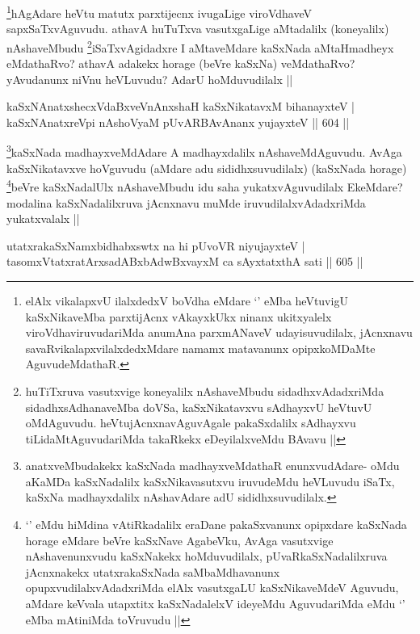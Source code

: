 \begin{artha}
\footnote{elAlx vikalapxvU ilalxdedxV boVdha eMdare `\stext' eMba heVtuvigU kaSxNikaveMba parxtijAcnx vAkayxkUkx ninanx ukitxyalelx viroVdhaviruvudariMda anumAna parxmANaveV udayisuvudilalx, jAcnxnavu savaRvikalapxvilalxdedxMdare namamx matavanunx opipxkoMDaMte AguvudeMdathaR.}hAgAdare heVtu matutx parxtijecnx ivugaLige viroVdhaveV sapxSaTxvAguvudu. athavA huTuTxva vasutxgaLige aMtadalilx (koneyalilx) nAshaveMbudu \footnote{huTiTxruva vasutxvige koneyalilx nAshaveMbudu sidadhxvAdadxriMda sidadhxsAdhanaveMba doVSa, kaSxNikatavxvu sAdhayxvU heVtuvU oMdAguvudu. heVtujAcnxnavAguvAgale pakaSxdalilx sAdhayxvu tiLidaMtAguvudariMda takaRkekx eDeyilalxveMdu BAvavu ||}iSaTxvAgidadxre I aMtaveMdare kaSxNada aMtaHmadheyx eMdathaRvo? athavA adakekx horage (beVre kaSxNa) veMdathaRvo? yAvudanunx niVnu heVLuvudu? AdarU hoMduvudilalx ||
\end{artha}


\begin{shl}
kaSxNAnatxshecxVdaBxveVnAnxshaH kaSxNikatavxM bihanayxteV | \\
kaSxNAnatxreV\s pi nAshoV\s yaM pUvARBAvAnanx yujayxteV \hfill||  604 ||  
\end{shl}

\begin{artha}
\footnote{anatxveMbudakekx kaSxNada madhayxveMdathaR enunxvudAdare- oMdu aKaMDa kaSxNadalilx kaSxNikavasutxvu iruvudeMdu heVLuvudu iSaTx, kaSxNa madhayxdalilx nAshavAdare adU sididhxsuvudilalx.}kaSxNada madhayxveMdAdare A madhayxdalilx nAshaveMdAguvudu. AvAga kaSxNikatavxve hoVguvudu (aMdare adu sididhxsuvudilalx) (kaSxNada horage) \footnote{`\stext' eMdu hiMdina vAtiRkadalilx eraDane pakaSxvanunx opipxdare kaSxNada horage eMdare beVre kaSxNave AgabeVku, AvAga vasutxvige nAshavenunxvudu kaSxNakekx hoMduvudilalx, pUvaRkaSxNadalilxruva jAcnxnakekx utatxrakaSxNada saMbaMdhavanunx opupxvudilalxvAdadxriMda elAlx vasutxgaLU kaSxNikaveMdeV Aguvudu, aMdare keVvala utapxtitx kaSxNadalelxV ideyeMdu AguvudariMda eMdu `\stext' eMba mAtiniMda toVruvudu ||}beVre kaSxNadalUlx nAshaveMbudu idu saha yukatxvAguvudilalx EkeMdare? modalina kaSxNadalilxruva jAcnxnavu muMde iruvudilalxvAdadxriMda yukatxvalalx ||
\end{artha}


\begin{shl}
utatxrakaSxNamxbidhabxswtx na hi pUvoVR niyujayxteV | \\
tasomxVtatxratArxsadABxbAdwBxvayxM ca sAyxtatxthA sati \hfill||  605 ||  
\end{shl}


